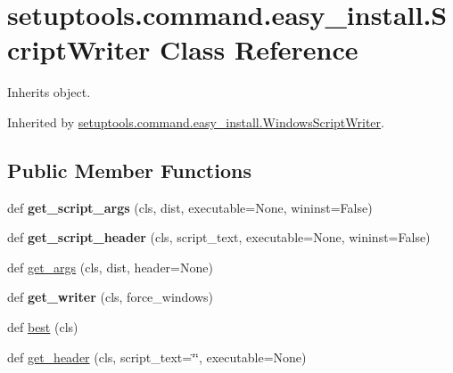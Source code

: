 \hypertarget{classsetuptools_1_1command_1_1easy__install_1_1_script_writer}{}\section{setuptools.\+command.\+easy\+\_\+install.\+Script\+Writer Class Reference}
\label{classsetuptools_1_1command_1_1easy__install_1_1_script_writer}


Inherits object.



Inherited by \hyperlink{classsetuptools_1_1command_1_1easy__install_1_1_windows_script_writer}{setuptools.\+command.\+easy\+\_\+install.\+Windows\+Script\+Writer}.

\subsection*{Public Member Functions}
\begin{DoxyCompactItemize}
\item 
\mbox{\label{classsetuptools_1_1command_1_1easy__install_1_1_script_writer_aa7ead9e9848c94c2e7731fc34536b955}} 
def {\bfseries get\+\_\+script\+\_\+args} (cls, dist, executable=None, wininst=False)
\item 
\mbox{\label{classsetuptools_1_1command_1_1easy__install_1_1_script_writer_af1af5f53d540528b220d31314786c7b7}} 
def {\bfseries get\+\_\+script\+\_\+header} (cls, script\+\_\+text, executable=None, wininst=False)
\item 
def \hyperlink{classsetuptools_1_1command_1_1easy__install_1_1_script_writer_a5cbbc2c35ff56058a69d574cb10907a4}{get\+\_\+args} (cls, dist, header=None)
\item 
\mbox{\label{classsetuptools_1_1command_1_1easy__install_1_1_script_writer_a1faee20409374fa87b93b0ee9ed293db}} 
def {\bfseries get\+\_\+writer} (cls, force\+\_\+windows)
\item 
def \hyperlink{classsetuptools_1_1command_1_1easy__install_1_1_script_writer_a1eae4e5243b93a8dd44ec91b0f4987f4}{best} (cls)
\item 
def \hyperlink{classsetuptools_1_1command_1_1easy__install_1_1_script_writer_ac83d10c941931452c67d870cb9a740a1}{get\+\_\+header} (cls, script\+\_\+text=\char`\"{}\char`\"{}, executable=None)
\end{DoxyCompactItemize}
